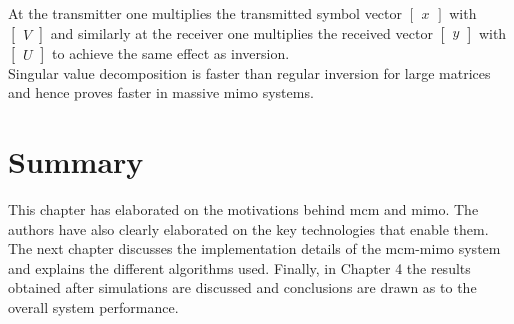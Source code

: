 At the transmitter one multiplies the transmitted symbol vector $\begin{bmatrix} x \end{bmatrix}$ with $\begin{bmatrix} V \end{bmatrix}$ and similarly at the receiver one multiplies the received vector $\begin{bmatrix} y \end{bmatrix}$ with $\begin{bmatrix} U \end{bmatrix}$ to achieve the same effect as inversion.\\
Singular value decomposition is faster than regular inversion for large matrices and hence proves faster in massive \acrshort{mimo} systems.

\section*{Summary}
This chapter has elaborated on the motivations behind \acrshort{mcm} and \acrshort{mimo}. The authors have also clearly elaborated on the key technologies that enable them. The next chapter discusses the implementation details of the \acrshort{mcm}-\acrshort{mimo} system and explains the different algorithms used. Finally, in Chapter 4 the results obtained after simulations are discussed and conclusions are drawn as to the overall system performance.  
